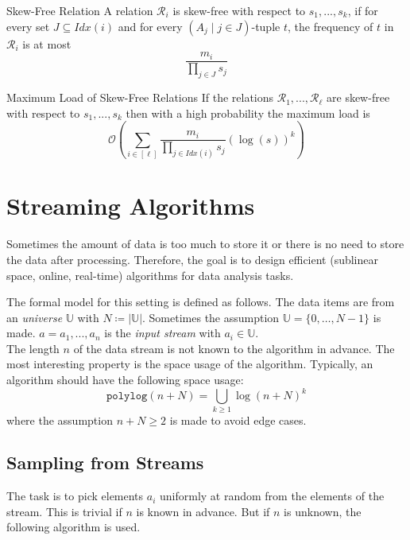 \documentclass[english]{panikzettel}
\begin{document}
\begin{halfboxl}
\vspace{-\baselineskip}
	\begin{defi}{Skew-Free Relation}
	A relation $\mathcal{R}_i$ is skew-free with respect to $s_1,...,s_k$, if for every set $J\subseteq Idx(i)$ and for every $(A_j \mid j\in J)$-tuple $t$, the frequency of $t$ in $\mathcal{R}_i$ is at most
	\[
	\frac{m_i}{\prod_{j\in J}s_j}
	\]
	\end{defi}
\end{halfboxl}
\begin{halfboxr}
\vspace{-\baselineskip}
	\begin{theo}{Maximum Load of Skew-Free Relations}
	If the relations $\mathcal{R}_1,...,\mathcal{R}_\ell$ are skew-free with respect to $s_1,...,s_k$ then with a high probability the maximum load is
	\[
	\mathcal{O}\left(\sum_{i\in [\ell]} \frac{m_i}{\prod_{j\in Idx(i)} s_j}(\log(s))^k \right)
	\]
	\end{theo}
\end{halfboxr}


\section{Streaming Algorithms}
Sometimes the amount of data is too much to store it or there is no need to store the data after processing. Therefore, the goal is to design efficient (sublinear space, online, real-time) algorithms for data analysis tasks.

The formal model for this setting is defined as follows. The data items are from an \emph{universe} $\mathbb{U}$ with $N\coloneqq |\mathbb{U}|$. Sometimes the assumption $\mathbb{U}=\{0,\ldots, N-1 \}$ is made. 
$a = a_1,...,a_n$ is the \emph{input stream} with $a_i\in\mathbb{U}$.\\
The length $n$ of the data stream is not known to the algorithm in advance. The most interesting property is the space usage of the algorithm. Typically, an algorithm should have the following space usage:
\[
\texttt{polylog}(n+N)=\underset{k\geq 1}{\bigcup} \log (n+N)^k
\]
where the assumption $n+N\geq 2$ is made to avoid edge cases.

\subsection{Sampling from Streams}
The task is to pick elements $a_i$ uniformly at random from the elements of the stream. This is trivial if $n$ is known in advance. But if $n$ is unknown, the following algorithm is used.
\end{document}
